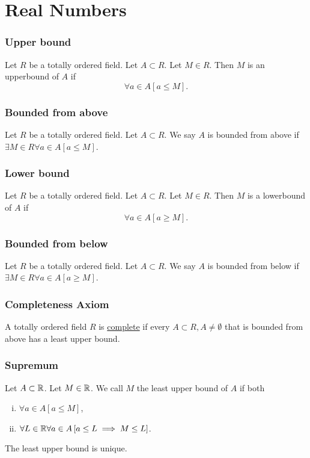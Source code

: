 \section{Real Numbers}


\subsubsection*{Upper bound}
\udef Let $R$ be a totally ordered field. Let $A \subset R$. Let $M \in R$.
Then $M$ is an upperbound of $A$ if
\begin{equation*}
    \forall a \in A \left[ a \leq M \right].
\end{equation*}


\subsubsection*{Bounded from above}
\udef Let $R$ be a totally ordered field. Let $A \subset R$. We say $A$ is
bounded from above if $\exists M \in R \forall a \in A \left[ a \leq M \right]$.


\subsubsection*{Lower bound}
\udef Let $R$ be a totally ordered field. Let $A \subset R$. Let $M \in R$.
Then $M$ is a lowerbound of $A$ if
\begin{equation*}
    \forall a \in A \left[ a \geq M \right].
\end{equation*}


\subsubsection*{Bounded from below}
\udef Let $R$ be a totally ordered field. Let $A \subset R$. We say $A$ is
bounded from below if $\exists M \in R \forall a \in A \left[ a \geq M \right]$.


\subsubsection*{Completeness Axiom}
A totally ordered field $R$ is \ul{complete} if every
$A \subset R, A \neq \emptyset$ that is bounded from above has a least upper bound.


\subsubsection*{Supremum}
Let $A \subset \mathbb{R}$. Let $M \in \mathbb{R}$. We call $M$ the least upper bound of $A$ if both
\begin{enumerate}[(i)]
    \item $\forall a \in A \left[ a \leq M \right]$,
    \item $\forall L \in \mathbb{R} \forall a \in A \left[ a \leq L \implies M \leq L \right]$.
\end{enumerate}
The least upper bound is unique.

